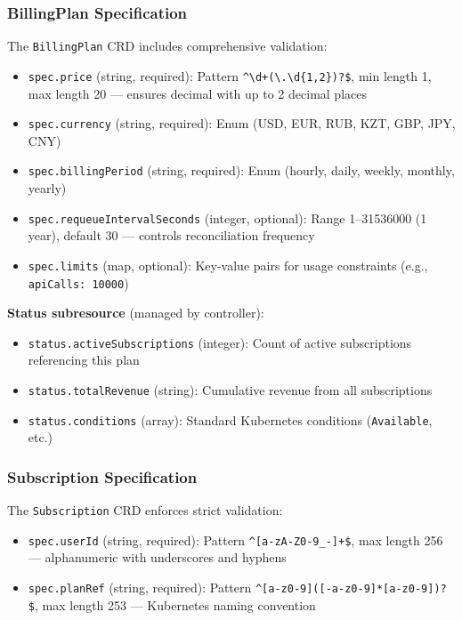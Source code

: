 \subsubsection{BillingPlan Specification}

The \texttt{BillingPlan} CRD includes comprehensive validation:

\begin{itemize}
    \item \texttt{spec.price} (string, required): Pattern \texttt{\textasciicircum{}\textbackslash d+(\textbackslash.\textbackslash d\{1,2\})?\$}, min length 1, max length 20 --- ensures decimal with up to 2 decimal places
    \item \texttt{spec.currency} (string, required): Enum (USD, EUR, RUB, KZT, GBP, JPY, CNY)
    \item \texttt{spec.billingPeriod} (string, required): Enum (hourly, daily, weekly, monthly, yearly)
    \item \texttt{spec.requeueIntervalSeconds} (integer, optional): Range 1--31536000 (1 year), default 30 --- controls reconciliation frequency
    \item \texttt{spec.limits} (map, optional): Key-value pairs for usage constraints (e.g., \texttt{apiCalls: 10000})
\end{itemize}

\textbf{Status subresource} (managed by controller):
\begin{itemize}
    \item \texttt{status.activeSubscriptions} (integer): Count of active subscriptions referencing this plan
    \item \texttt{status.totalRevenue} (string): Cumulative revenue from all subscriptions
    \item \texttt{status.conditions} (array): Standard Kubernetes conditions (\texttt{Available}, etc.)
\end{itemize}

\subsubsection{Subscription Specification}

The \texttt{Subscription} CRD enforces strict validation:

\begin{itemize}
    \item \texttt{spec.userId} (string, required): Pattern \texttt{\textasciicircum{}[a-zA-Z0-9\_-]+\$}, max length 256 --- alphanumeric with underscores and hyphens
    \item \texttt{spec.planRef} (string, required): Pattern \texttt{\textasciicircum{}[a-z0-9]([-a-z0-9]*[a-z0-9])?\$}, max length 253 --- Kubernetes naming convention
\end{itemize}

